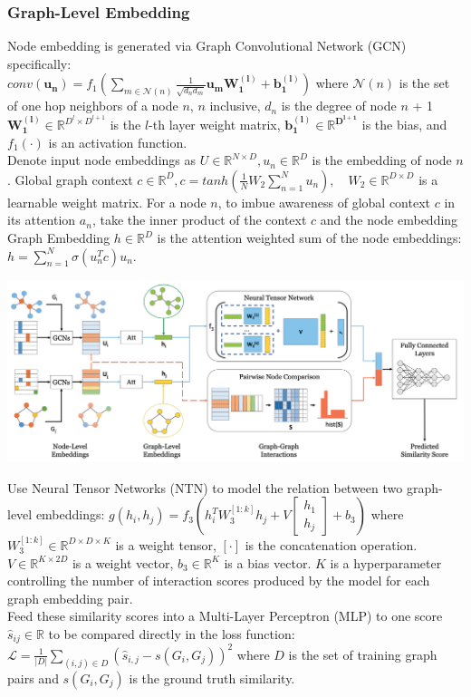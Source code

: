\documentclass{article}
\begin{document}
\subsubsection{Graph-Level Embedding}  Node embedding is generated via Graph Convolutional Network (GCN) specifically:\\ $conv(\mathbf{u_n}) = f_1(\sum_{m \in \mathcal{N}(n)}\frac{1}{\sqrt{d_nd_m}}\mathbf{u_mW_1^{(l)} + b_1^{(l)}})$
where $\mathcal{N}(n)$ is the set of one hop neighbors of a node $n$, $n$ inclusive, $d_n$ is the degree of node $n$ + 1 $\mathbf{W_1^{(l)}} \in \mathbb{R}^{D^l \times D^{l+1}}$ is the $l$-th layer weight matrix, $\mathbf{b_1^{(l)} \in \mathbb{R}^{D^{l+1}}}$ is the bias, and $f_1(\cdot)$ is an activation function.\\
Denote input node embeddings as $U \in \mathbb{R}^{N \times D}, u_n \in \mathbb{R}^D$ is the embedding of node $n$. Global graph context $c \in \mathbb{R}^D, c = tanh(\frac{1}{N}W_2\sum_{n=1}^Nu_n),\quad W_2 \in \mathbb{R}^{D \times D}$ is a learnable weight matrix. For a node $n$, to imbue awareness of global context $c$ in its attention $a_n$, take the inner product of the context $c$ and the node embedding
Graph Embedding $h \in \mathbb{R}^D$ is the attention weighted sum of the node embeddings: $h = \sum_{n=1}^N\sigma(u_n^Tc)u_n$.\\
\centerline{\includegraphics[width=\columnwidth]{Images/Similarity2-1.png}}
Use Neural Tensor Networks (NTN) to model the relation between two graph-level embeddings:
$g(h_i, h_j) = f_3(h_i^TW_3^{[1:k]}h_j + V\begin{bmatrix} h_1 \\ h_j \end{bmatrix} + b_3)$
where $W_3^{[1:k]} \in \mathbb{R}^{D \times D \times K}$ is a weight tensor, $[\cdot]$ is the concatenation operation.
$V \in \mathbb{R}^{K \times 2D}$ is a weight vector, $b_3 \in \mathbb{R}^K$ is a bias vector. $K$ is a hyperparameter controlling the number of interaction scores produced by the model for each graph embedding pair.\\
Feed these similarity scores into a Multi-Layer Perceptron (MLP) to one score $\hat{s}_{ij} \in \mathbb{R}$ to be compared directly in the loss function:
$\mathcal{L} = \frac{1}{|D|} \sum_{(i,j) \in D}(\hat{s}_{i,j} - s(G_i, G_j))^2$
where $D$ is the set of training graph pairs and $s(G_i, G_j)$ is the ground truth similarity.\\
\end{document}
